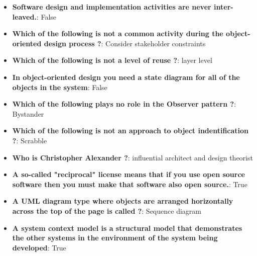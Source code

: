 \documentclass{report}
\begin{document}
    \pagebreak 
    \begin{itemize}
        \item \textbf{Software design and implementation activities are never inter-leaved.}: False
        \item \textbf{Which of the following is not a common activity during the object-oriented design process ?}: Consider stakeholder constraints
        \item \textbf{Which of the following is not a level of reuse ?}: layer level
        \item \textbf{In object-oriented design you need a state diagram for all of the objects in the system}: False
        \item \textbf{Which of the following plays no role in the Observer pattern ?}: Bystander
        \item \textbf{Which of the following is not an approach to object indentification ?}: Scrabble
        \item \textbf{Who is Christopher Alexander ?}: influential architect and design theorist
        \item \textbf{A so-called "reciprocal" license means that if you use open source software then you must make that software also open source.}: True
        \item \textbf{A UML diagram type where objects are arranged horizontally across the top of the page is called ?}: Sequence diagram
        \item \textbf{A system context model is a structural model that demonstrates the other systems in the environment of the system being developed}: True
    \end{itemize}
\end{document}
